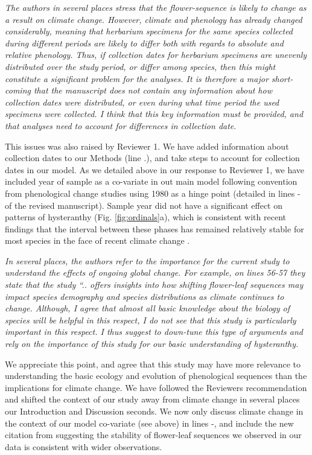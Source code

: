 \documentclass{article}[12pt]
\begin{document}
\emph{The authors in several places stress that the flower-sequence is likely to change as a result on climate change. However, climate and phenology has already changed considerably, meaning that herbarium specimens for the same species collected during different periods are likely to differ both with regards to absolute and relative phenology. Thus, if collection dates for herbarium specimens are unevenly distributed over the study period, or differ among species, then this might constitute a significant problem for the analyses. It is therefore a major short-coming that the manuscript does not contain any information about how collection dates were distributed, or even during what time period the used specimens were collected. I think that this key information must be provided, and that analyses need to account for differences in collection date}.


This issues was also raised by Reviewer 1. We have added information about collection dates to our Methods (line .), and take steps to account for collection dates in our model. As we detailed above in our response to  Reviewer 1, we have included year of sample as a co-variate in out main model following convention from phenological change studies using 1980 as a hinge point (detailed in lines - of the revised manuscript). Sample year did not have a significant effect on patterns of hysteranthy (Fig. \ref{fig:ordinals}a), which is consistent with recent findings that the interval between these phases has remained relatively stable for most species in the face of recent climate change \citep{Guo:2023wb}. 


\emph{In several places, the authors refer to the importance for the current study to understand the effects of ongoing global change. For example, on lines 56-57 they state that the study “.. offers insights into how shifting flower-leaf sequences may impact species demography and species distributions as climate continues to change. Although, I agree that almost all basic knowledge about the biology of species will be helpful in this respect, I do not see that this study is particularly important in this respect. I thus suggest to down-tune this type of arguments and rely on the importance of this study for our basic understanding of hysteranthy.}

We appreciate this point, and agree that this study may have more relevance to understanding the basic ecology and evolution of phenological sequences than the implications for climate change. We have followed the Reviewers recommendation and shifted the context of our study away from climate change in several places our Introduction and Discussion seconds. We now only discuss climate change in the context of our model co-variate (see above) in lines -, and include the new citation from \citet{Guo:2023wb} suggesting the stability of flower-leaf sequences we observed in our data is consistent with wider observations.
\end{document}
